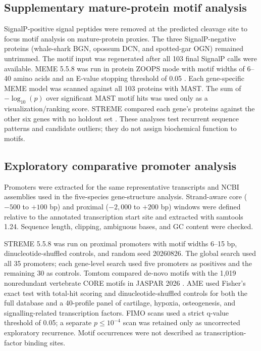 \subsection{Supplementary mature-protein motif analysis}
\label{subsec:protein-motifs}

SignalP-positive signal peptides were removed at the predicted cleavage site to
focus motif analysis on mature-protein proxies. The three SignalP-negative
proteins (whale-shark BGN, opossum DCN, and spotted-gar OGN) remained
untrimmed. The motif input was regenerated after all 103 final SignalP calls
were available. MEME 5.5.8 was run in protein ZOOPS mode with motif
widths of 6--40 amino acids and an E-value stopping threshold of 0.05
\citep{Bailey2015MEME}. Each gene-specific MEME model was scanned against all 103
proteins with MAST. The sum of $-\log_{10}(p)$ over significant MAST motif hits
was used only as a visualization/ranking score. STREME compared each gene's
proteins against the other six genes with no holdout set
\citep{Bailey2021STREME}. These analyses test recurrent sequence patterns and
candidate outliers; they do not assign biochemical function to motifs.

\subsection{Exploratory comparative promoter analysis}
\label{subsec:promoter-analysis}

Promoters were extracted for the same representative transcripts and NCBI
assemblies used in the five-species gene-structure analysis. Strand-aware core
($-500$ to $+100$ bp) and proximal ($-2{,}000$ to $+200$ bp) windows were defined
relative to the annotated transcription start site and extracted with samtools
1.24. Sequence length, clipping, ambiguous bases, and GC content were checked.

STREME 5.5.8 was run on proximal promoters with motif widths 6--15 bp,
dinucleotide-shuffled controls, and random seed 20260826. The global search used
all 35 promoters; each gene-level search used five promoters as positives and
the remaining 30 as controls. Tomtom compared de-novo motifs with the 1,019
nonredundant vertebrate CORE motifs in JASPAR 2026
\citep{Ovek2026JASPAR}. AME used Fisher's exact test with total-hit scoring and
dinucleotide-shuffled controls for both the full database and a 40-profile panel
of cartilage, hypoxia, osteogenesis, and signalling-related transcription
factors. FIMO scans used a strict q-value threshold of 0.05; a separate
$p\leq10^{-4}$ scan was retained only as uncorrected exploratory recurrence.
Motif occurrences were not described as transcription-factor binding sites.

